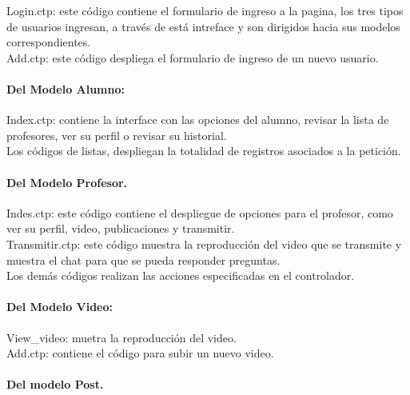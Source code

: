 \documentclass[12pt]{article}
\begin{document}
Login.ctp: este código contiene el formulario de ingreso a la pagina, los tres tipos de usuarios ingresan, 
a través de está intreface y son dirigidos hacia sus modelos correspondientes.\\

Add.ctp: este código despliega el formulario de ingreso de un nuevo usuario.\\

\paragraph{Del Modelo Alumno:\\}

Index.ctp: contiene la interface con las opciones del alumno, revisar la lista de profesores, ver 
su perfil o revisar su historial.\\

Los códigos de listas, despliegan la totalidad de registros asociados a la petición.\\

\paragraph{Del Modelo Profesor.\\}

Indes.ctp: este código contiene el despliegue de opciones para el profesor, como ver su perfil, video,
publicaciones y transmitir.\\

Transmitir.ctp: este código muestra la reproducción del video que se transmite y muestra el chat para que se 
pueda responder preguntas.\\

Los demás códigos realizan las acciones especificadas en el controlador.\\

\paragraph{Del Modelo Video:\\ }

View\_video: muetra la reproducción del video.\\

Add.ctp: contiene el código para subir un nuevo video.\\

\paragraph{Del modelo Post.\\}
\end{document}
